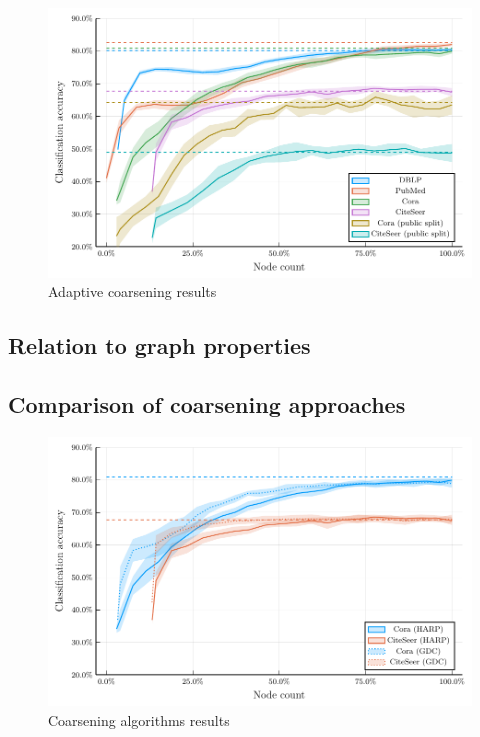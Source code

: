 \begin{figure}
  \centering
  \includegraphics[width=\linewidth]{images/adaptive-coarsening/adaptive-coarsening.pdf}
  \caption{Adaptive coarsening results}
  \label{fig:adaptive-coarsening}
\end{figure}

\subsection{Relation to graph properties}


\subsection{Comparison of coarsening approaches}

\begin{figure}
  \centering
  \includegraphics[width=\linewidth]{images/coarsening-algorithms/coarsening-algorithms.pdf}
  \caption{Coarsening algorithms results}
  \label{fig:coarsening-algorithms}
\end{figure}
